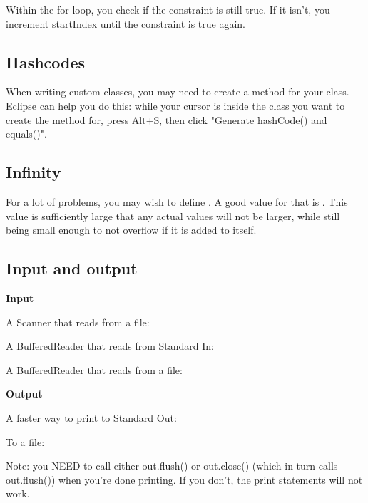 Within the for-loop, you check if the constraint is still true. If it isn't, you increment startIndex until the constraint is true again.

\subsection*{Hashcodes}

When writing custom classes, you may need to create a  method for your class. Eclipse can help you do this: while your cursor is inside the class you want to create the method for, press Alt+S, then click "Generate hashCode() and equals()".

\subsection*{Infinity}

For a lot of problems, you may wish to define . A good value for that is . This value is sufficiently large that any actual values will not be larger, while still being small enough to not overflow if it is added to itself.

\subsection*{Input and output}

\textbf{Input}

A Scanner that reads from a file: 

A BufferedReader that reads from Standard In: 

A BufferedReader that reads from a file: 

\textbf{Output}

A faster way to print to Standard Out: 

To a file: 

Note: you NEED to call either out.flush() or out.close() (which in turn calls out.flush()) when you're done printing. If you don't, the print statements will not work.

